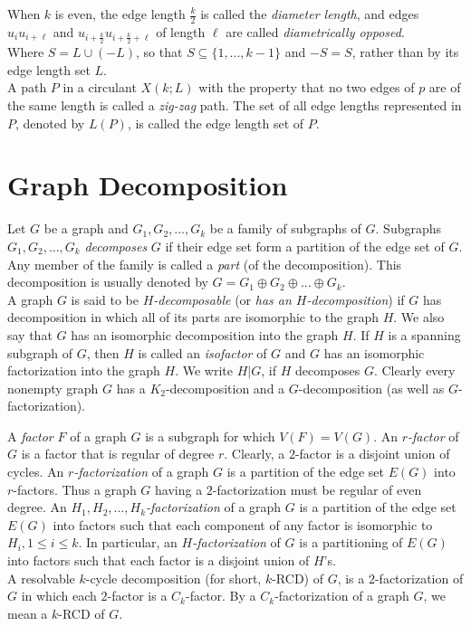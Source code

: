 \documentclass[12pt]{report}
\begin{document}
When $k$ is even, the edge length $\frac{k}{2}$ is called the {\em diameter length}, and edges $u_iu_{i+\ell}$ and $u_{i+\frac{k}{2}}u_{i+\frac{k}{2}+\ell}$ of length $\ell$ are called {\em diametrically opposed}.\\
Where $S=L\cup (-L)$, so that $S\subseteq \{1,...,k-1\}$ and $-S=S$, rather than by its edge length set $L$.\\
A path $P$ in a circulant $X(k;L)$ with the property that no two
edges of $p$ are of the same length is called a {\em zig-zag} path.
The set of all edge lengths represented in $P$, denoted by $L(P)$,
is called the edge length set of $P$.
\section{Graph Decomposition}
Let $G$ be a graph and $G_1,G_2,...,G_k$ be a family of subgraphs of $G$. Subgraphs $G_1,G_2,...,G_k$ {\em decomposes} $G$ if their edge set form a partition of the edge set of $G$. Any member of the family is called a {\em part} (of the decomposition). This decomposition is usually denoted by $G=G_1\oplus G_2\oplus...\oplus G_k$.\\
A graph $G$ is said to be {\em $H$-decomposable} (or {\em has an
$H$-decomposition}) if $G$ has decomposition in which  all of its
parts are isomorphic to the graph $H$. We also say that $G$ has an
isomorphic decomposition into the graph $H$. If $H$ is a spanning
subgraph of $G$, then $H$ is called an {\em isofactor} of $G$ and
$G$ has an isomorphic factorization into the graph $H$. We write
$H|G$, if $H$ decomposes $G$. Clearly every nonempty graph $G$ has a
$K_2$-decomposition and a $G$-decomposition (as well as
$G$-factorization).

A {\em factor} $F$ of a graph $G$ is a subgraph for which
$V(F)=V(G)$. An {\em $r$-factor} of $G$ is a factor that is regular
of degree $r$. Clearly, a $2$-factor is a disjoint union of cycles.
An {\em $r$-factorization} of a graph $G$ is a partition of the edge
set $E(G)$ into $r$-factors. Thus a graph $G$ having a
$2$-factorization must be regular of even degree. An {\em
${H_1,H_2,...,H_k }$-factorization} of a graph $G$ is a partition of
the edge set $E(G)$ into factors such that each component of any
factor is isomorphic to $H_i, 1\leq i\leq k$. In particular, an {\em
$H$-factorization} of $G$ is a partitioning of $E(G)$ into factors
such that each factor is a disjoint union of $H$'s.\\
A resolvable $k$-cycle decomposition  (for short, $k$-RCD) of $G$,
is a $2$-factorization of $G$ in which each $2$-factor  is a
$C_k$-factor.  By a $C_k$-factorization of a graph $G$, we mean a
$k$-RCD of $G$.
\end{document}
